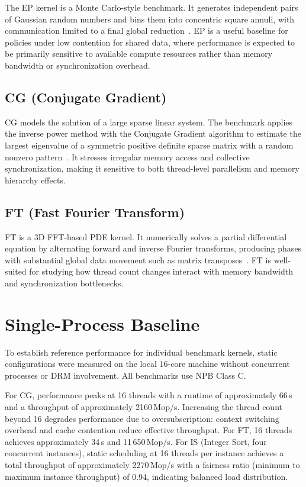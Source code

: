 The EP kernel is a Monte Carlo-style benchmark. It generates independent pairs of Gaussian random numbers and bins them into concentric square annuli, with communication limited to a final global reduction~\parencite{jin_openmp_nodate}. EP is a useful baseline for policies under low contention for shared data, where performance is expected to be primarily sensitive to available compute resources rather than memory bandwidth or synchronization overhead.

\subsection{CG (Conjugate Gradient)}

CG models the solution of a large sparse linear system. The benchmark applies the inverse power method with the Conjugate Gradient algorithm to estimate the largest eigenvalue of a symmetric positive definite sparse matrix with a random nonzero pattern~\parencite{jin_openmp_nodate}. It stresses irregular memory access and collective synchronization, making it sensitive to both thread-level parallelism and memory hierarchy effects.

\subsection{FT (Fast Fourier Transform)}

FT is a 3D FFT-based PDE kernel. It numerically solves a partial differential equation by alternating forward and inverse Fourier transforms, producing phases with substantial global data movement such as matrix transposes~\parencite{jin_openmp_nodate}. FT is well-suited for studying how thread count changes interact with memory bandwidth and synchronization bottlenecks.

\section{Single-Process Baseline}

To establish reference performance for individual benchmark kernels, static configurations were measured on the local 16-core machine without concurrent processes or DRM involvement. All benchmarks use NPB Class C.

For CG, performance peaks at 16 threads with a runtime of approximately 66\,s and a throughput of approximately 2160\,Mop/s. Increasing the thread count beyond 16 degrades performance due to oversubscription: context switching overhead and cache contention reduce effective throughput. For FT, 16 threads achieves approximately 34\,s and 11\,650\,Mop/s. For IS (Integer Sort, four concurrent instances), static scheduling at 16 threads per instance achieves a total throughput of approximately 2270\,Mop/s with a fairness ratio (minimum to maximum instance throughput) of 0.94, indicating balanced load distribution.

